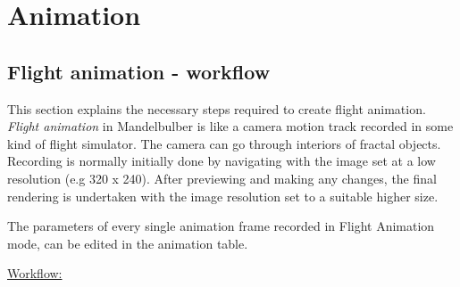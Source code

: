\section{Animation}\label{animation}

\subsection{Flight animation - workflow}\label{flight-animation}

This section explains the necessary steps required to create flight animation. \emph{Flight animation} in Mandelbulber is like a camera motion track recorded in some kind of flight simulator. The camera can go through interiors of fractal objects.
Recording is normally initially done by navigating with the image set at a low resolution (e.g 320 x 240). After previewing and making any changes, the final rendering is undertaken with the image resolution set to a suitable higher size.

The parameters of every single animation frame recorded in Flight Animation mode, can be edited in the animation table.

\underline{Workflow:}

